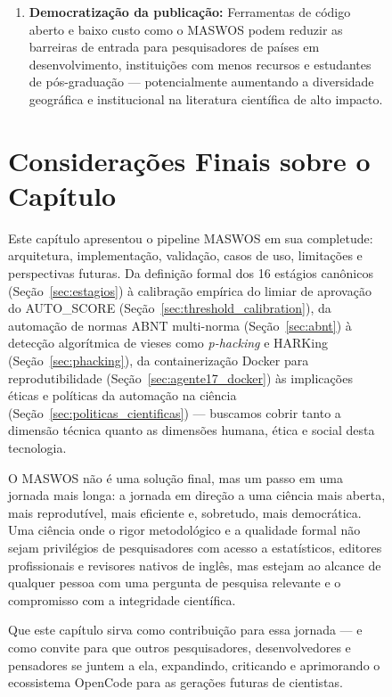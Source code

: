\begin{figure}
\begin{enumerate}
    \item \textbf{Democratização da publicação:} Ferramentas de
    código aberto e baixo custo como o MASWOS podem reduzir as
    barreiras de entrada para pesquisadores de países em
    desenvolvimento, instituições com menos recursos e estudantes
    de pós-graduação — potencialmente aumentando a diversidade
    geográfica e institucional na literatura científica de alto
    impacto.
\end{enumerate}

\section{Considerações Finais sobre o Capítulo}
\label{sec:consideracoes_finais_cap}

Este capítulo apresentou o pipeline MASWOS em sua completude:
arquitetura, implementação, validação, casos de uso, limitações e
perspectivas futuras. Da definição formal dos 16 estágios
canônicos (Seção~\ref{sec:estagios}) à calibração empírica do
limiar de aprovação do AUTO\_SCORE
(Seção~\ref{sec:threshold_calibration}), da automação de normas
ABNT multi-norma (Seção~\ref{sec:abnt}) à detecção algorítmica de
vieses como \textit{p-hacking} e HARKing
(Seção~\ref{sec:phacking}), da containerização Docker para
reprodutibilidade (Seção~\ref{sec:agente17_docker}) às implicações
éticas e políticas da automação na ciência
(Seção~\ref{sec:politicas_cientificas}) — buscamos cobrir tanto a
dimensão técnica quanto as dimensões humana, ética e social desta
tecnologia.

O MASWOS não é uma solução final, mas um passo em uma jornada
mais longa: a jornada em direção a uma ciência mais aberta, mais
reprodutível, mais eficiente e, sobretudo, mais democrática. Uma
ciência onde o rigor metodológico e a qualidade formal não sejam
privilégios de pesquisadores com acesso a estatísticos, editores
profissionais e revisores nativos de inglês, mas estejam ao
alcance de qualquer pessoa com uma pergunta de pesquisa relevante
e o compromisso com a integridade científica.

Que este capítulo sirva como contribuição para essa jornada — e
como convite para que outros pesquisadores, desenvolvedores e
pensadores se juntem a ela, expandindo, criticando e aprimorando
o ecossistema OpenCode para as gerações futuras de cientistas.




\end{figure}
